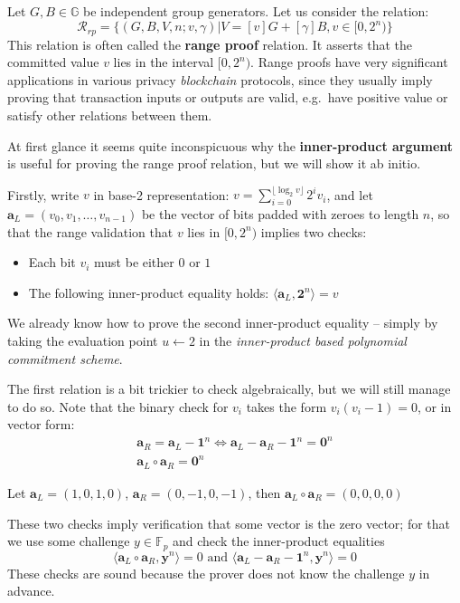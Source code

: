 \documentclass[../../book.tex]{subfiles}
\begin{document}
Let $G,B\in \mathbb{G}$ be independent group generators. Let us consider the relation:
$$\mathcal{R}_{rp} = \{ (G, B, V, n; v, \gamma) \vert V = [v]G + [\gamma]B, v \in [0, 2^n) \}$$
This relation is often called the \textbf{range proof} relation. It asserts that the committed value $v$ lies in the interval $[0, 2^n)$. Range proofs have very significant applications in various privacy \textit{blockchain} protocols, since they usually imply proving that transaction inputs or outputs are valid, e.g.\ have positive value or satisfy other relations between them.

At first glance it seems quite inconspicuous why the \textbf{inner-product argument} is useful for proving the range proof relation, but we will show it ab initio.

Firstly, write $v$ in base-2 representation: $v = \sum_{i=0}^{\lfloor \log_2 v \rfloor} 2^i v_i$, and let $\mathbf{a}_L = (v_0, v_1, \dots, v_{n-1})$ be the vector of bits padded with zeroes to length $n$, so that the range validation that $v$ lies in $[0, 2^n)$ implies two checks:
\begin{itemize}
    \item Each bit $v_i$ must be either $0$ or $1$
    \item The following inner-product equality holds: $\langle \mathbf{a}_L, \mathbf{2}^n \rangle = v$
\end{itemize}

We already know how to prove the second inner-product equality -- simply by taking the evaluation point $u \gets 2$ in the \textit{inner-product based polynomial commitment scheme}.

The first relation is a bit trickier to check algebraically, but we will still manage to do so. Note that the binary check for $v_i$ takes the form $v_i(v_i - 1) = 0$, or in vector form:
\begin{align*}
    \mathbf{a}_R = \mathbf{a}_L - \mathbf{1}^n \Leftrightarrow  \mathbf{a}_L - \mathbf{a}_R - \mathbf{1}^n = \mathbf{0}^n \\
    \mathbf{a}_L \circ \mathbf{a}_R = \mathbf{0}^n
\end{align*}

\begin{example}
    Let $\mathbf{a}_L = (1, 0, 1, 0)$, $\mathbf{a}_R = (0, -1, 0, -1)$, then 
    $\mathbf{a}_L \circ \mathbf{a}_R = (0, 0, 0, 0)$
\end{example}

These two checks imply verification that some vector is the zero vector; for that we use some challenge $y \in \mathbb{F}_p$ and check the inner-product equalities $$\langle \mathbf{a}_L \circ \mathbf{a}_R, \mathbf{y}^n \rangle = 0 \text{ and } \langle \mathbf{a}_L - \mathbf{a}_R - \mathbf{1}^n, \mathbf{y}^n \rangle = 0$$
These checks are sound because the prover does not know the challenge $y$ in advance.
\end{document}
